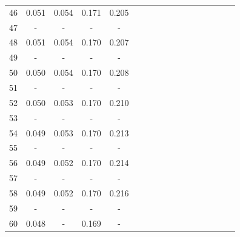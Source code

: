 \documentclass{report}
\begin{document}
\begin{table}
\begin{tabular}{|c|cccc|cccc|cccc|cccc|}
46 & 0.051 & 0.054 & 0.171 & 0.205 & & & & & & & & & & & &\\
47 &   -   &   -   &   -   &   -   & & & & & & & & & & & &\\
48 & 0.051 & 0.054 & 0.170 & 0.207 & & & & & & & & & & & &\\
49 &   -   &   -   &   -   &   -   & & & & & & & & & & & &\\
50 & 0.050 & 0.054 & 0.170 & 0.208 & & & & & & & & & & & &\\
51 &   -   &   -   &   -   &   -   & & & & & & & & & & & &\\
52 & 0.050 & 0.053 & 0.170 & 0.210 & & & & & & & & & & & &\\
53 &   -   &   -   &   -   &   -   & & & & & & & & & & & &\\
54 & 0.049 & 0.053 & 0.170 & 0.213 & & & & & & & & & & & &\\
55 &   -   &   -   &   -   &   -   & & & & & & & & & & & &\\
56 & 0.049 & 0.052 & 0.170 & 0.214 & & & & & & & & & & & &\\
57 &   -   &   -   &   -   &   -   & & & & & & & & & & & &\\
58 & 0.049 & 0.052 & 0.170 & 0.216 & & & & & & & & & & & &\\
59 &   -   &   -   &   -   &   -   & & & & & & & & & & & &\\
60 & 0.048 &   -   & 0.169 &   -   & & & & & & & & & & & &\\
\hline
\end{tabular}
\end{table}
\end{document}
